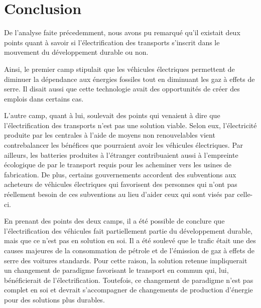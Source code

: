 
\chapter{Conclusion}

De l'analyse faite précedemment, nous avons pu remarqué qu'il existait deux points quant à savoir si l'électrification des transports s'inscrit dans le mouvement du développement durable ou non. 

Ainsi, le premier camp stipulait que les véhicules électriques permettent de diminuer la dépendance aux énergies fossiles tout en diminuant les gaz à effets de serre.
Il disait aussi que cette technologie avait des opportunités de créer des emplois dans certains cas.

L'autre camp, quant à lui, soulevait des points qui venaient à dire que l'électrification des transports n'est pas une solution viable. Selon eux, l'électricité produite par les centrales à l'aide de moyens non renouvelables vient contrebalancer les bénéfices que pourraient avoir les véhicules électriques. Par ailleurs, les batteries produites à l'étranger contribuaient aussi à l'empreinte écologique de par le transport requis pour les acheminer vers les usines de fabrication. De plus, certains gouvernements accordent des subventions aux acheteurs de véhicules électriques qui favorisent des personnes qui n'ont pas réellement besoin de ces subventions au lieu d'aider ceux qui sont visés par celle-ci.

En prenant des points des deux camps, il a été possible de conclure que l'électrification des véhicules fait partiellement partie du développement durable, mais que ce n'est pas en solution en soi. Il a été soulevé que le trafic était une des causes majeures de la consommation de pétrole et de l'émission de gaz à effets de serre des voitures standards. Pour cette raison, la solution retenue impliquerait un changement de paradigme favorisant le transport en commun qui, lui, bénéficierait de l'électrification. Toutefois, ce changement de paradigme n'est pas complet en soi et devrait s'accompagner de changements de production d'énergie pour des solutions plus durables.
